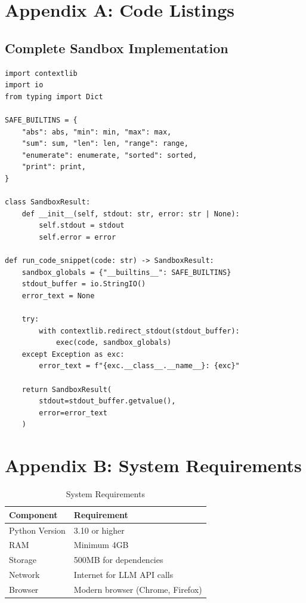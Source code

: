 \documentclass[12pt,a4paper]{article}
\begin{document}
\appendix

\section{Appendix A: Code Listings}

\subsection{Complete Sandbox Implementation}

\begin{lstlisting}[caption=sandbox.py - Full Implementation]
import contextlib
import io
from typing import Dict

SAFE_BUILTINS = {
    "abs": abs, "min": min, "max": max,
    "sum": sum, "len": len, "range": range,
    "enumerate": enumerate, "sorted": sorted,
    "print": print,
}

class SandboxResult:
    def __init__(self, stdout: str, error: str | None):
        self.stdout = stdout
        self.error = error

def run_code_snippet(code: str) -> SandboxResult:
    sandbox_globals = {"__builtins__": SAFE_BUILTINS}
    stdout_buffer = io.StringIO()
    error_text = None
    
    try:
        with contextlib.redirect_stdout(stdout_buffer):
            exec(code, sandbox_globals)
    except Exception as exc:
        error_text = f"{exc.__class__.__name__}: {exc}"
    
    return SandboxResult(
        stdout=stdout_buffer.getvalue(),
        error=error_text
    )
\end{lstlisting}

\section{Appendix B: System Requirements}

\begin{table}[h]
\centering
\begin{tabular}{|l|l|}
\hline
\textbf{Component} & \textbf{Requirement} \\
\hline
Python Version & 3.10 or higher \\
RAM & Minimum 4GB \\
Storage & 500MB for dependencies \\
Network & Internet for LLM API calls \\
Browser & Modern browser (Chrome, Firefox) \\
\hline
\end{tabular}
\caption{System Requirements}
\end{table}
\end{document}
